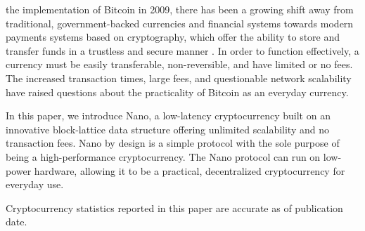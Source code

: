  the implementation of Bitcoin in 2009, there has been a growing shift away from traditional, government-backed currencies and financial systems towards modern payments systems based on cryptography, which offer the ability to store and transfer funds in a trustless and secure manner \cite{Nakamoto_bitcoin:a}. In order to function effectively, a currency must be easily transferable, non-reversible, and have limited or no fees. The increased transaction times, large fees, and questionable network scalability have raised questions about the practicality of Bitcoin as an everyday currency.

In this paper, we introduce Nano, a low-latency cryptocurrency built on an innovative block-lattice data structure offering unlimited scalability and no transaction fees. Nano by design is a simple protocol with the sole purpose of being a high-performance cryptocurrency. The Nano protocol can run on low-power hardware, allowing it to be a practical, decentralized cryptocurrency for everyday use.

Cryptocurrency statistics reported in this paper are accurate as of publication date.